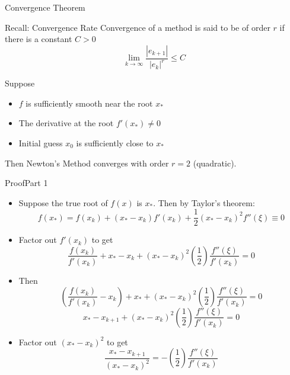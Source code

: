 \documentclass[10pt]{beamer}
\begin{document}
\begin{frame}[shrink]{Convergence Theorem}

\begin{block}{Recall: Convergence Rate}
  Convergence of a method is said to be of order $r$ if there is a
constant $C>0$ 
\begin{equation*}
  \lim_{k\rightarrow \infty} \frac{|e_{k+1}|}{|e_k|^r} \leq C
\end{equation*}
\end{block}
\bigskip

\begin{theorem}
Suppose 
\begin{itemize}
    \item $f$ is sufficiently smooth near the root $x_*$
    \item The derivative at the root $f'(x_*) \ne 0$
    \item Initial guess $x_0$ is sufficiently close to $x_*$
\end{itemize}
Then Newton's Method converges with order $r=2$ (quadratic).

\end{theorem}


\end{frame}
\begin{frame}{Proof}{Part 1}
\begin{itemize}
\item Suppose the true root of $f(x)$ is $x_*$. Then by Taylor's theorem: 
    \begin{equation*}
      f(x_{*}) = f(x_k) + (x_{*}-x_k)f'(x_k) + \frac{1}{2}(x_{*}-x_k)^2 f''(\xi) \equiv 0 
    \end{equation*}
\item Factor out $f'(x_k)$ to get
\begin{equation*}
   \frac{f(x_k)}{f'(x_k)} + x_{*}-x_k + (x_{*}-x_k)^2 \left(\frac{1}{2}\right) \frac{f''(\xi)}{f'(x_k)} = 0
\end{equation*}
\item Then
\begin{equation*}
  \left(\frac{f(x_k)}{f'(x_k)} -x_k\right)+ x_{*} + (x_{*}-x_k)^2 \left(\frac{1}{2}\right) \frac{f''(\xi)}{f'(x_k)} = 0
\end{equation*}
\begin{equation*}
  x_{*}-x_{k+1} + (x_{*}-x_k)^2 \left(\frac{1}{2}\right) \frac{f''(\xi)}{f'(x_k)} = 0
\end{equation*}
\item Factor out $(x_{*}-x_k)^2$ to get
\begin{equation*}
  \frac{x_{*}-x_{k+1}}{(x_{*}-x_k)^2}  = -\left(\frac{1}{2}\right) \frac{f''(\xi)}{f'(x_k)}
\end{equation*}
\end{itemize}
\end{frame}
\end{document}
